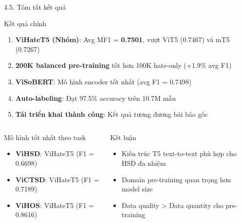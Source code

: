 \documentclass[11pt, aspectratio=169]{beamer}
\begin{document}
\begin{frame}{4.5. Tóm tắt kết quả}

\begin{block}{Kết quả chính}
  \begin{enumerate}
    \item \textbf{ViHateT5 (Nhóm)}: Avg MF1 = \textbf{0.7501}, vượt ViT5 (0.7467) và mT5 (0.7267)
    \item \textbf{200K balanced pre-training} tốt hơn 100K hate-only (+1.9\% avg F1)
    \item \textbf{ViSoBERT}: Mô hình encoder tốt nhất (avg F1 = 0.7498)
    \item \textbf{Auto-labeling}: Đạt 97.5\% accuracy trên 10.7M mẫu
    \item \textbf{Tái triển khai thành công}: Kết quả tương đương bài báo gốc
  \end{enumerate}
\end{block}

\vspace{0.3cm}
\begin{columns}[T]
  \begin{block}{Mô hình tốt nhất theo task}
    \begin{itemize}
      \item \textbf{ViHSD}: ViHateT5 (F1 = 0.6698)
      \item \textbf{ViCTSD}: ViHateT5 (F1 = 0.7189)
      \item \textbf{ViHOS}: ViHateT5 (F1 = 0.8616)
    \end{itemize}
  \end{block}

  \begin{block}{Kết luận}
    \begin{itemize}
      \item Kiến trúc T5 text-to-text phù hợp cho HSD đa nhiệm
      \item Domain pre-training quan trọng hơn model size
      \item Data quality > Data quantity cho pre-training
    \end{itemize}
  \end{block}
\end{columns}
\end{frame}
\end{document}
